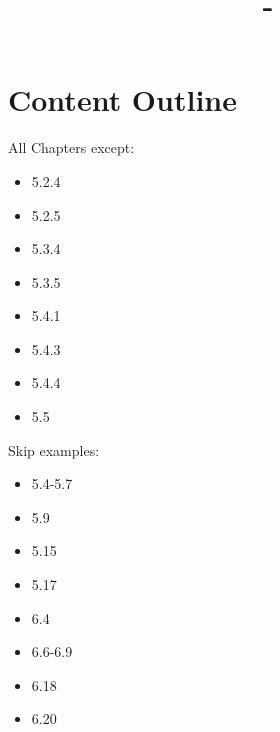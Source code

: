 \documentclass[answers,12pt,addpoints]{exam}
\author{\name}
\title{\course \ - \assignment}
\begin{document}
\maketitle
\tableofcontents

\newpage
\section*{Content Outline}
All Chapters except:
\begin{itemize}
    \item 5.2.4
    \item 5.2.5
    \item 5.3.4
    \item 5.3.5
    \item 5.4.1
    \item 5.4.3
    \item 5.4.4
    \item 5.5
\end{itemize}
Skip examples:
\begin{itemize}
    \item 5.4-5.7
    \item 5.9
    \item 5.15
    \item 5.17
    \item 6.4
    \item 6.6-6.9
    \item 6.18
    \item 6.20
\end{itemize}
\end{document}
